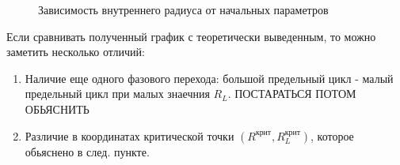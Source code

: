 \documentclass[12pt]{article}
\begin{document}
\begin{figure}[H]
	\centering
	\begin{minipage}[h]{0.47\linewidth}
	\end{minipage}
		\hfill
	\begin{minipage}[h]{0.47\linewidth}
	\end{minipage}
	\label{fig::real_fig-3}
	\caption{Зависимость внутреннего радиуса от начальных параметров}
\end{figure}

Если сравнивать полученный график с теоретически выведенным, то можно заметить несколько отличий:
\begin{enumerate}
	\item Наличие еще одного фазового перехода: большой предельный цикл - малый предельный цикл при малых знаечния $R_L$. ПОСТАРАТЬСЯ ПОТОМ ОБЬЯСНИТЬ
	\item Различие в координатах критической точки $(R^{\text{крит}}, R_L^{\text{крит}})$, которое обьяснено в след. пункте.
\end{enumerate}
\end{document}

